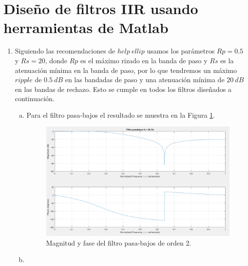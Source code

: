 \documentclass[letterpaper,onecolumn,10pt,journal,final]{IEEEtran}
\begin{document}
%
%
\section{Diseño de filtros IIR usando herramientas de Matlab}
\begin{enumerate}[1)]
    \item%
Siguiendo las recomendaciones de $help~ellip$ usamos los parámetros $Rp = 0.5$
y $Rs = 20$, donde $Rp$ es el máximo rizado en la banda de paso y $Rs$ es la atenuación mínima en la banda de paso, por lo que tendremos un máximo 
$ripple$ de $0.5~dB$ en las bandadas de paso y una atenuación mínima de $20~dB$ en las bandas de rechazo. Esto se cumple en todos los filtros diseñados a continuación. \\
        \begin{enumerate}[a)]
            \item %
            
                Para el filtro pasa-bajos el resultado se muestra en la Figura \ref{fig:IV_1a}.
                \begin{figure}[H]
                \centering
                \includegraphics[width=0.75 \linewidth]{Figuras/IV_1)a).png}
                \caption{Magnitud y fase del filtro pasa-bajos de orden 2.}
                \label{fig:IV_1a}
                 \end{figure}
             
            \item %
            

\end{enumerate}
\end{enumerate}
\end{document}
